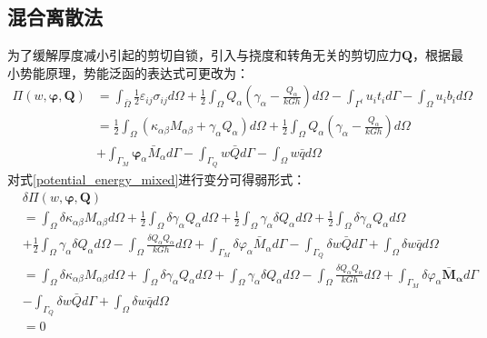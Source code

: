 \subsection{混合离散法}
为了缓解厚度减小引起的剪切自锁，引入与挠度和转角无关的剪切应力$\pmb{Q}$，根据最小势能原理，势能泛函的表达式可更改为：
\begin{equation}\label{potential_energy_mixed}
\begin{split} 
    \Pi(w,\boldsymbol{\varphi},\boldsymbol{Q})&=\int_{\bar\Omega}\frac{1}{2}\varepsilon_{ij}\sigma_{ij} d\Omega+\frac{1}{2}\int_{\Omega}Q_{\alpha}(\gamma_{\alpha}-\frac{Q_{\alpha}}{kGh})d\Omega-\int_{\Gamma^{t}} u_{i}t_{i}d\Gamma-\int_{\Omega} u_{i}b_{i}d\Omega\\
    &=\frac{1}{2}\int_{\Omega}(\kappa_{\alpha \beta}M_{\alpha \beta}+\gamma_{\alpha}Q_{\alpha})d\Omega+\frac{1}{2}\int_{\Omega}Q_{\alpha}(\gamma_{\alpha}-\frac{Q_{\alpha}}{kGh})d\Omega\\
    &+\int_{\Gamma_{M}}\pmb\varphi_{\alpha}{\bar{M}_{\alpha}}d\Gamma-\int_{\Gamma_{Q}}{w}\bar {Q}d\Gamma-\int_{\Omega} w\bar{q}d\Omega
\end{split}
\end{equation}
对式\eqref{potential_energy_mixed}进行变分可得弱形式：
\begin{equation} 
    \begin{split}
    &\delta\Pi(w,\boldsymbol\varphi,\boldsymbol{Q})\\
    &=\int_{\Omega}\delta\kappa_{\alpha \beta}M_{\alpha \beta}d\Omega+\frac{1}{2}\int_{\Omega}\delta\gamma_{\alpha}Q_{\alpha}d\Omega+\frac{1}{2}\int_{\Omega}\gamma_{\alpha}\delta{Q}_{\alpha}d\Omega+\frac{1}{2}\int_{\Omega}\delta\gamma_{\alpha}Q_{\alpha}d\Omega\\
    &+\frac{1}{2}\int_{\Omega}\gamma_{\alpha}\delta{Q}_{\alpha}d\Omega-\int_{\Omega}\frac{\delta{Q}_{\alpha}{Q}_{\alpha}}{kGh}d\Omega+\int_{\Gamma_{M}}\delta\varphi_{\alpha}{{\bar M}_{\alpha}}d\Gamma-\int_{\Gamma_{Q}}\delta{w}{\bar Q}d\Gamma+\int_{\Omega} \delta{w}\bar{q}d\Omega\\
    &=\int_{\Omega}\delta\kappa_{\alpha \beta}M_{\alpha \beta}d\Omega+\int_{\Omega}\delta\gamma_{\alpha}Q_{\alpha}d\Omega+\int_{\Omega}\gamma_{\alpha}\delta{Q}_{\alpha}d\Omega-\int_{\Omega}\frac{\delta{Q}_{\alpha}{Q}_{\alpha}}{kGh}d\Omega+\int_{\Gamma_{M}}\delta\varphi_{\alpha}{\boldsymbol{\bar M}_{\boldsymbol{\alpha}}}d\Gamma\\
    &-\int_{\Gamma_{Q}}\delta{w}{\bar Q}d\Gamma+\int_{\Omega} \delta{w}\bar{q}d\Omega\\
    &=0
    \end{split}
\end{equation}
